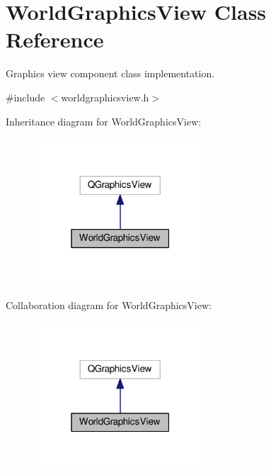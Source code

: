 \hypertarget{classWorldGraphicsView}{}\section{World\+Graphics\+View Class Reference}
\label{classWorldGraphicsView}


Graphics view component class implementation.  




{\ttfamily \#include $<$worldgraphicsview.\+h$>$}



Inheritance diagram for World\+Graphics\+View\+:
\nopagebreak
\begin{figure}[H]
\begin{center}
\leavevmode
\includegraphics[width=183pt]{d8/d05/classWorldGraphicsView__inherit__graph}
\end{center}
\end{figure}


Collaboration diagram for World\+Graphics\+View\+:
\nopagebreak
\begin{figure}[H]
\begin{center}
\leavevmode
\includegraphics[width=183pt]{d9/d69/classWorldGraphicsView__coll__graph}
\end{center}
\end{figure}
